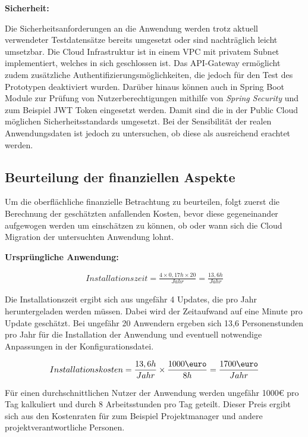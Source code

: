\textbf{Sicherheit:}

Die Sicherheitsanforderungen an die Anwendung werden trotz aktuell verwendeter Testdatensätze bereits umgesetzt oder sind nachträglich leicht umsetzbar. Die Cloud Infrastruktur ist in einem \ac{VPC} mit privatem Subnet implementiert, welches in sich geschlossen ist. Das API-Gateway ermöglicht zudem zusätzliche Authentifizierungsmöglichkeiten, die jedoch für den Test des Prototypen deaktiviert wurden. Darüber hinaus können auch in \gls{Spring Boot} Module zur Prüfung von Nutzerberechtigungen mithilfe von \textit{Spring Security} und zum Beispiel JWT Token eingesetzt werden. Damit sind die in der Public Cloud möglichen Sicherheitsstandards umgesetzt. Bei der Sensibilität der realen Anwendungsdaten ist jedoch zu untersuchen, ob diese als ausreichend erachtet werden.

\subsection{Beurteilung der finanziellen Aspekte}
Um die oberflächliche finanzielle Betrachtung zu beurteilen, folgt zuerst die Berechnung der geschätzten anfallenden Kosten, bevor diese gegeneinander aufgewogen werden um einschätzen zu können, ob oder wann sich die Cloud Migration der untersuchten Anwendung lohnt.

\textbf{Ursprüngliche Anwendung:}

\begin{align}
    Installationszeit = \frac{4 \times 0,17h \times 20}{Jahr} = \frac{13,6h}{Jahr}
\end{align}

Die Installationszeit ergibt sich aus ungefähr 4 Updates, die pro Jahr heruntergeladen werden müssen. Dabei wird der Zeitaufwand auf eine Minute pro Update geschätzt. Bei ungefähr 20 Anwendern ergeben sich 13,6 Personenstunden pro Jahr für die Installation der Anwendung und eventuell notwendige Anpassungen in der Konfigurationsdatei.

\begin{align}
    Installationskosten = \frac{13,6h}{Jahr} \times \frac{1000\mbox{\euro}}{8h} =\frac{1700\mbox{\euro}}{Jahr}
\end{align}

Für einen durchschnittlichen Nutzer der Anwendung werden ungefähr 1000€ pro Tag kalkuliert und durch 8 Arbeitsstunden pro Tag geteilt. Dieser Preis ergibt sich aus den Kostenraten für zum Beispiel Projektmanager und andere projektverantwortliche Personen. \pagebreak

